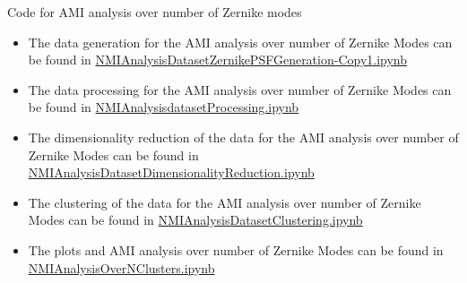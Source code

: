 	Code for AMI analysis over number of Zernike modes
	\begin{itemize}
		\item The data generation for the AMI analysis over number of Zernike Modes can be found in \href{https://github.com/Dacarpe03/PLImageReconstruction/blob/main/PSFReconstruction/DataNotebooks/NMIAnalysisDatasetZernikePSFGeneration-Copy1.ipynb}{NMIAnalysisDatasetZernikePSFGeneration-Copy1.ipynb}
		\item The data processing for the AMI analysis over number of Zernike Modes can be found in \href{https://github.com/Dacarpe03/PLImageReconstruction/blob/main/PSFReconstruction/DataNotebooks/NMIAnalysisdatasetProcessing.ipynb}{NMIAnalysisdatasetProcessing.ipynb}
		\item The dimensionality reduction of the data for the AMI analysis over number of Zernike Modes can be found in \href{https://github.com/Dacarpe03/PLImageReconstruction/blob/main/PSFReconstruction/DataNotebooks/NMIAnalysisDatasetDimensionalityReduction.ipynb}{NMIAnalysisDatasetDimensionalityReduction.ipynb}
		\item The clustering of the data for the AMI analysis over number of Zernike Modes can be found in \href{https://github.com/Dacarpe03/PLImageReconstruction/blob/main/PSFReconstruction/DataNotebooks/NMIAnalysisDatasetClustering.ipynb}{NMIAnalysisDatasetClustering.ipynb}
		\item The plots and AMI analysis over number of Zernike Modes can be found in \href{https://github.com/Dacarpe03/PLImageReconstruction/blob/main/PSFReconstruction/DataNotebooks/NMIAnalysisOverNClusters.ipynb}{NMIAnalysisOverNClusters.ipynb}
	\end{itemize}
	
